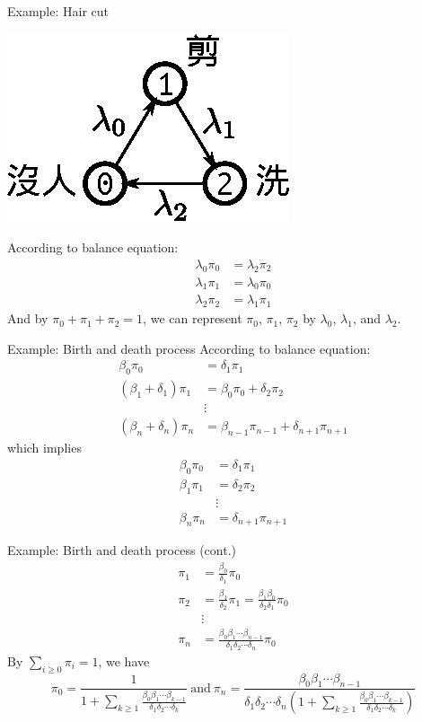 \documentclass[mathserif]{beamer}
\begin{document}
\begin{frame}{Example: Hair cut}
\begin{center}
\includegraphics[scale=1.0]{hair_cut}
\end{center}
According to balance equation:
\begin{align*}
\lambda_0 \pi_0 & = \lambda_2 \pi_2 \\
\lambda_1 \pi_1 & = \lambda_0 \pi_0 \\
\lambda_2 \pi_2 & = \lambda_1 \pi_1
\end{align*}
And by $\pi_0 + \pi_1 + \pi_2 = 1$, we can represent $\pi_0$, $\pi_1$, $\pi_2$ by $\lambda_0$, $\lambda_1$, and $\lambda_2$.
\end{frame}

\begin{frame}{Example: Birth and death process}
According to balance equation:
\begin{align*}
\beta_0 \pi_0 & = \delta_1 \pi_1 \\
(\beta_1 + \delta_1)\pi_1 & = \beta_0 \pi_0 + \delta_2 \pi_2 \\
& \vdots \\
(\beta_n + \delta_n)\pi_n & = \beta_{n-1} \pi_{n-1} + \delta_{n+1} \pi_{n+1}
\end{align*}
which implies
\begin{align*}
\beta_0 \pi_0 & = \delta_1 \pi_1 \\
\beta_1 \pi_1 & = \delta_2 \pi_2 \\
& \vdots \\
\beta_n \pi_n & = \delta_{n+1} \pi_{n+1}
\end{align*}
\end{frame}

\begin{frame}{Example: Birth and death process (cont.)}
\begin{align*}
\pi_1 & = \frac{\beta_0}{\delta_1} \pi_0 \\
\pi_2 & = \frac{\beta_1}{\delta_2} \pi_1 = \frac{\beta_1 \beta_0}{\delta_2 \delta_1}\pi_0 \\
& \vdots \\
\pi_n & = \frac{\beta_0 \beta_1 \cdots \beta_{n-1}}{\delta_1 \delta_2 \cdots \delta_n} \pi_0
\end{align*}
By $\sum_{i\geq 0} \pi_i = 1$, we have
\[
\pi_0 = \frac{1}{1 + \sum_{k\geq 1}\frac{\beta_0 \beta_1 \cdots \beta_{k-1}}{\delta_1 \delta_2 \cdots \delta_k}}
~\text{and}~ \pi_n = \frac{\beta_0 \beta_1 \cdots \beta_{n-1}}{\delta_1 \delta_2 \cdots \delta_n
(1 + \sum_{k\geq 1}\frac{\beta_0 \beta_1 \cdots \beta_{k-1}}{\delta_1 \delta_2 \cdots \delta_k})}
\]
\end{frame}
\end{document}
